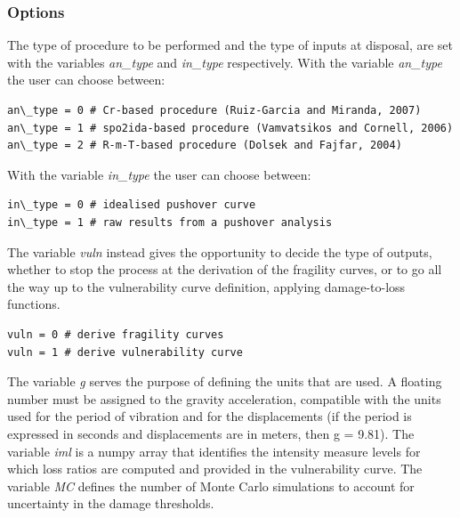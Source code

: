 \subsubsection{Options}
\label{subsubsec:options}
The type of procedure to be performed and the type of inputs at disposal, are set with the variables \textit{an\_type} and \textit{in\_type} respectively. With the variable \textit{an\_type} the user can choose between:

\begin{Verbatim}[frame=single, commandchars=\\\{\}, samepage=true]
an\_type = 0 # Cr-based procedure (Ruiz-Garcia and Miranda, 2007)
an\_type = 1 # spo2ida-based procedure (Vamvatsikos and Cornell, 2006)
an\_type = 2 # R-m-T-based procedure (Dolsek and Fajfar, 2004)
\end{Verbatim}

With the variable \textit{in\_type} the user can choose between:

\begin{Verbatim}[frame=single, commandchars=\\\{\}, samepage=true]
in\_type = 0 # idealised pushover curve
in\_type = 1 # raw results from a pushover analysis
\end{Verbatim}

The variable \textit{vuln} instead gives the opportunity to decide the type of outputs, whether to stop the process at the derivation of the fragility curves, or to go all the way up to the vulnerability curve definition, applying damage-to-loss functions.

\begin{Verbatim}[frame=single, commandchars=\\\{\}, samepage=true]
vuln = 0 # derive fragility curves 
vuln = 1 # derive vulnerability curve
\end{Verbatim}

The variable \textit{g} serves the purpose of defining the units that are used. A floating number must be assigned to the gravity acceleration, compatible with the units used for the period of vibration and for the displacements (if the period is expressed in seconds and displacements are in meters, then g = 9.81). The variable \textit{iml} is a numpy array that identifies the intensity measure levels for which loss ratios are computed and provided in the vulnerability curve. The variable \textit{MC} defines the number of Monte Carlo simulations to account for uncertainty in the damage thresholds.

